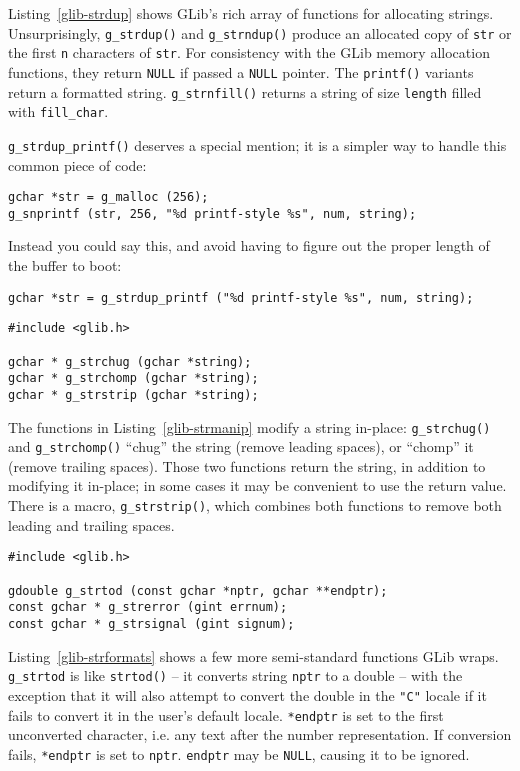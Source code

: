 Listing~\ref{glib-strdup} shows GLib's rich array of functions for allocating strings. Unsurprisingly, \lstinline{g_strdup()} and \lstinline{g_strndup()} produce an allocated copy of \lstinline{str} or the first \lstinline{n} characters of \lstinline{str}. For consistency with the GLib memory allocation functions, they return \lstinline{NULL} if passed a \lstinline{NULL} pointer. The \lstinline{printf()} variants return a formatted string. \lstinline{g_strnfill()} returns a string of size \lstinline{length} filled with \lstinline{fill_char}.

\lstinline{g_strdup_printf()} deserves a special mention; it is a simpler way to handle this common piece of code:
\begin{lstlisting}
gchar *str = g_malloc (256);
g_snprintf (str, 256, "%d printf-style %s", num, string);
\end{lstlisting}

Instead you could say this, and avoid having to figure out the proper length of the buffer to boot:
\begin{lstlisting}
gchar *str = g_strdup_printf ("%d printf-style %s", num, string);
\end{lstlisting}

\begin{lstlisting}[float, caption={In-place string modifications}, label=glib-strmanip]
#include <glib.h>

gchar * g_strchug (gchar *string);
gchar * g_strchomp (gchar *string);
gchar * g_strstrip (gchar *string);
\end{lstlisting}

The functions in Listing~\ref{glib-strmanip} modify a string in-place: \lstinline{g_strchug()} and \lstinline{g_strchomp()} ``chug'' the string (remove leading spaces), or ``chomp'' it (remove trailing spaces). Those two functions return the string, in addition to modifying it in-place; in some cases it may be convenient to use the return value. There is a macro, \lstinline{g_strstrip()}, which combines both functions to remove both leading and trailing spaces.

\begin{lstlisting}[float, caption={String Conversions}, label=glib-strformats]
#include <glib.h>

gdouble g_strtod (const gchar *nptr, gchar **endptr);
const gchar * g_strerror (gint errnum);
const gchar * g_strsignal (gint signum);
\end{lstlisting}

Listing~\ref{glib-strformats} shows a few more semi-standard functions GLib wraps. \lstinline{g_strtod} is like \lstinline{strtod()} -- it converts string \lstinline{nptr} to a double -- with the exception that it will also attempt to convert the double in the \texttt{"C"} locale if it fails to convert it in the user's default locale. \lstinline{*endptr} is set to the first unconverted character, i.e. any text after the number representation. If conversion fails, \lstinline{*endptr} is set to \lstinline{nptr}. \lstinline{endptr} may be \lstinline{NULL}, causing it to be ignored.

